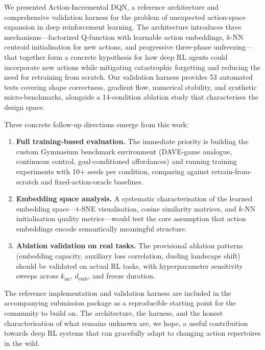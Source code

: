 \documentclass{article}
\begin{document}
We presented Action-Incremental DQN, a reference architecture and
comprehensive validation harness for the problem of unexpected action-space
expansion in deep reinforcement learning. The architecture introduces three
mechanisms---factorized Q-function with learnable action embeddings, $k$-NN
centroid initialisation for new actions, and progressive three-phase
unfreezing---that together form a concrete hypothesis for how deep RL agents
could incorporate new actions while mitigating catastrophic forgetting and
reducing the need for retraining from scratch. Our validation harness provides
53 automated tests covering shape correctness, gradient flow, numerical
stability, and synthetic micro-benchmarks, alongside a 14-condition ablation
study that characterises the design space.

Three concrete follow-up directions emerge from this work:

\begin{enumerate}
  \item \textbf{Full training-based evaluation.} The immediate priority is
  building the custom Gymnasium benchmark environment (DAVE-game analogue,
  continuous control, goal-conditioned affordances) and running training
  experiments with 10+ seeds per condition, comparing against
  retrain-from-scratch and fixed-action-oracle baselines.
  \item \textbf{Embedding space analysis.} A systematic characterisation of
  the learned embedding space---t-SNE visualisation, cosine similarity
  matrices, and $k$-NN initialisation quality metrics---would test the core
  assumption that action embeddings encode semantically meaningful structure.
  \item \textbf{Ablation validation on real tasks.} The provisional ablation
  patterns (embedding capacity, auxiliary loss correlation, dueling landscape
  shift) should be validated on actual RL tasks, with hyperparameter
  sensitivity sweeps across $k_\text{nn}$, $d_\text{emb}$, and freeze duration.
\end{enumerate}

The reference implementation and validation harness are included in the
accompanying submission package as a reproducible starting point for the
community to build on. The architecture, the harness, and the honest
characterisation of what remains unknown are, we hope, a useful contribution
towards deep RL systems that can gracefully adapt to changing action
repertoires in the wild.


\end{document}
